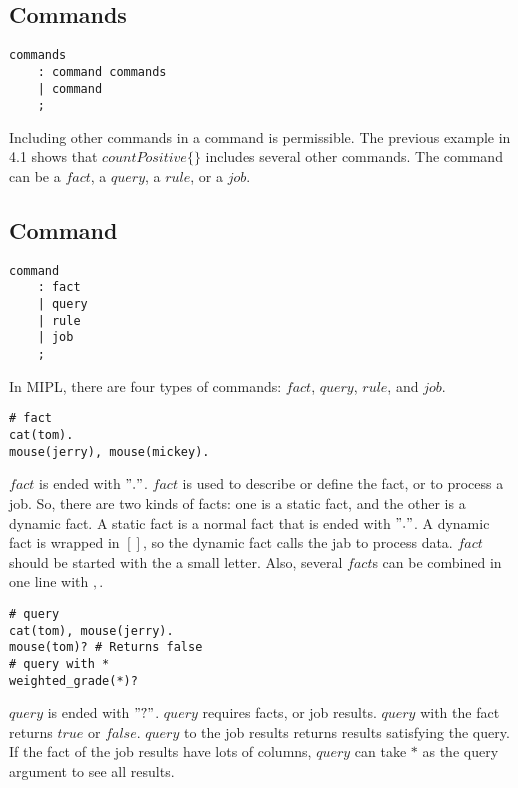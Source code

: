 \documentclass[prodmode,acmtecs]{acmsmall}
\begin{document}
\subsection{Commands}

\begin{lstlisting}
commands
	: command commands
	| command
	;
\end{lstlisting}

Including other commands in a command is permissible. The previous example in 4.1
 shows that $countPositive\{\}$ includes several other commands. The command can
 be a $fact$, a $query$, a $rule$, or a $job$.\\

\subsection{Command}

\begin{lstlisting}
command
	: fact
	| query
	| rule
	| job
	;
\end{lstlisting}

In MIPL, there are four types of commands: $fact$, $query$, $rule$, and $job$.\\

\begin{lstlisting}
# fact
cat(tom).
mouse(jerry), mouse(mickey).
\end{lstlisting}

$fact$ is ended with $"."$. $fact$ is used to describe or define the fact, or to
 process a job. So, there are two kinds of facts: one is a static fact, and the other
 is a dynamic fact. A static fact is a normal fact that is ended with $"."$. A dynamic
 fact is wrapped in $[ ]$, so the dynamic fact calls the jab to process data. $fact$
 should be started with the a small letter. Also, several $fact$s can be combined
 in one line with $,$.\\

\begin{lstlisting}
# query
cat(tom), mouse(jerry).
mouse(tom)? # Returns false
# query with *
weighted_grade(*)?
\end{lstlisting}

$query$ is ended with $"?"$. $query$ requires facts, or job results. $query$ with
 the fact returns $true$ or $false$. $query$ to the job results returns results 
 satisfying the query. If the fact of the job results have lots of columns, $query$ can
 take $*$ as the query argument to see all results.\\
\end{document}
